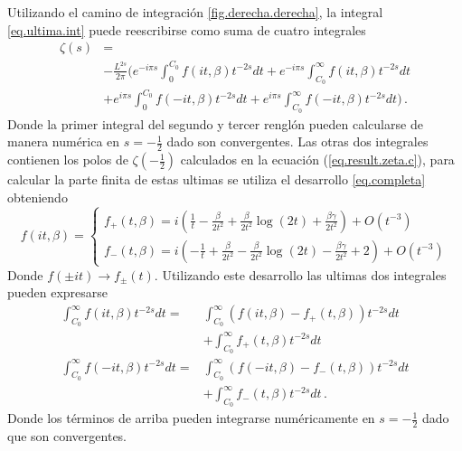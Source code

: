 Utilizando el camino de integración \ref{fig.derecha.derecha}, la integral \ref{eq.ultima.int} puede reescribirse como suma de cuatro integrales
\begin{align}
\label{eq.zeta.completa.2}
	\zeta (s) 
&	
	= 
\\
\nonumber
&
- \frac{L ^{2s}}{2 \pi } 
\Bigg(	  e ^{- i \pi s} \int _0 ^{C _0}
			f (i t,\beta )
			t ^{-2s}  dt 
		+ e ^{- i \pi s} \int _{C _0} ^{\infty}
			f (i t,\beta )
			t ^{-2s}  dt 
\\
\nonumber
&
		+ e ^{i \pi s} \int _{0} ^{C _0} 
			f (-i t,\beta )
			t ^{-2s}  dt 
		+ e ^{i \pi s} \int _{C _0} ^{\infty}
			f (-i t,\beta )
			t ^{-2s}  dt 
	\Bigg)
\, .
\end{align}
Donde la primer integral del segundo y tercer renglón pueden calcularse de manera numérica en $s= -\frac{1}{2}$ dado son convergentes. Las otras dos integrales contienen los polos de $\zeta \left(- \frac{1}{2} \right)$ calculados en la ecuación (\ref{eq.result.zeta.c}), para calcular la parte finita de estas ultimas se utiliza el desarrollo \eqref{eq.completa} obteniendo
\[ 
f   ( i t ,\beta )=
\begin{cases} 
	  f _{+} ( t, \beta) = 
	  i  \left(
			\frac{1}{t} - \frac{\beta}{2 t ^2 } + \frac{\beta}{2 t^2}
			\log (2 t) + \frac{\beta \gamma}{2 t^2} 
			\right) + O (t ^{-3})
\\
	  f _{-} ( t, \beta) =
      i  \left(
			- \frac{1}{t} + \frac{\beta}{2 t ^2 } - \frac{\beta}{2 t^2}
			\log (2 t) - \frac{\beta \gamma}{2 t^2} +2
			\right) + O (t ^{-3})
   \end{cases}   
\]
Donde $f (\pm i t ) \rightarrow f _{\pm} (t) $.
Utilizando este desarrollo las ultimas dos integrales pueden expresarse
\begin{align}
\nonumber
	\int _{C _0} ^{\infty}
			f (i t,\beta )
			t ^{-2s}  dt =& 
	\int _{C _0} ^{\infty}
		\left(
			f (it, \beta) - f _{+} (t, \beta )			
				\right) t ^{-2s} dt 
\label{eq.arriba1}
\\ &+ 
	\int _{C _0} ^{\infty}
			f _{+} ( t, \beta)
			 t ^{-2s} dt  \\
\nonumber
	\int _{C _0} ^{\infty}
			f (-i t,\beta )
			t ^{-2s}  dt 
=& 
	\int _{C _0} ^{\infty}
		\left(
			f (-it, \beta) - f _{-} (t, \beta )			
				\right) t ^{-2s} dt 
	\\ &+ 
\label{eq.arriba2}
	\int _{C _0} ^{\infty}
			f _{-} ( t, \beta)
			 t ^{-2s} dt
\, .
\end{align}
Donde los términos de arriba pueden integrarse numéricamente en $s=- \frac{1}{2}$ dado que son convergentes. 
